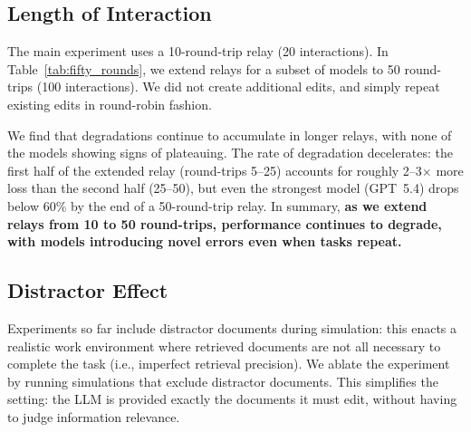 \documentclass{article} %
\begin{document}
\begin{table}[t]
\vspace{-2\intextsep}
\begin{minipage}[t]{0.48\textwidth}
\vspace{0pt}
\centering

\caption{Document size effect on degradation for GPT~5.4. Larger documents degrade more, with the gap widening from 2 to 20 interactions.}
\label{tab:context_size}
\end{minipage}\hfill
\begin{minipage}[t]{0.48\textwidth}
\vspace{0pt}
\centering

\caption{Interaction length effect on degradation, extending relays to 100 interactions. All models show monotonic decline, with no signs of plateauing.}
\label{tab:fifty_rounds}
\end{minipage}
\vspace{-1\intextsep}
\end{table}

\subsection{Length of Interaction} \label{sec:fifty_rounds}

The main experiment uses a 10-round-trip relay (20 interactions). In Table~\ref{tab:fifty_rounds}, we extend relays for a subset of models to 50 round-trips (100 interactions). We did not create additional edits, and simply repeat existing edits in round-robin fashion.

We find that degradations continue to accumulate in longer relays, with none of the models showing signs of plateauing. The rate of degradation decelerates: the first half of the extended relay (round-trips 5--25) accounts for roughly 2--3$\times$ more loss than the second half (25--50), but even the strongest model (GPT~5.4) drops below 60\% by the end of a 50-round-trip relay. In summary, \textbf{as we extend relays from 10 to 50 round-trips, performance continues to degrade, with models introducing novel errors even when tasks repeat.}

\subsection{Distractor Effect} \label{sec:distractor}


Experiments so far include distractor documents during simulation: this enacts a realistic work environment where retrieved documents are not all necessary to complete the task (i.e., imperfect retrieval precision). We ablate the experiment by running simulations that exclude distractor documents. This simplifies the setting: the LLM is provided exactly the documents it must edit, without having to judge information relevance.
\end{document}
